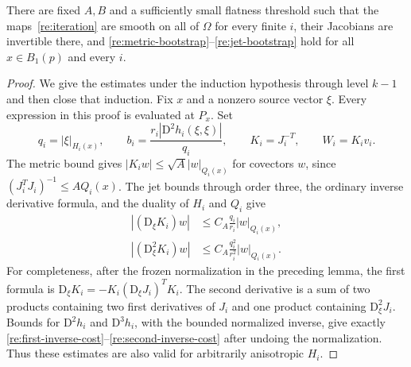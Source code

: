 \begin{proposition}
 \label{re:metric-iteration}
There are fixed $A,B$ and a sufficiently small flatness threshold
such that the maps~\eqref{re:iteration} are smooth on all of $\Omega$
for every finite $i$, their Jacobians are invertible there, and
\eqref{re:metric-bootstrap}--\eqref{re:jet-bootstrap} hold for all
$x\in B_1(p)$ and every $i$.
\end{proposition}

\begin{proof}
We give the estimates under the induction hypothesis through level
$k-1$ and then close that induction.  Fix $x$ and a nonzero source
vector $\xi$.  Every expression in this proof is evaluated at $P_x$.
Set
\[
 q_i=|\xi|_{H_i(x)},\qquad
 b_i=\frac{r_i|\mathrm D^2h_i(\xi,\xi)|}{q_i},\qquad
 K_i=J_i^{-T},\qquad W_i=K_iv_i.
\]
The metric bound gives $|K_iw|\le\sqrt A|w|_{Q_i(x)}$ for
covectors $w$, since
$(J_i^TJ_i)^{-1}\le A Q_i(x)$.
The jet bounds through order three, the ordinary inverse derivative
formula, and the duality of $H_i$ and $Q_i$ give
\begin{align}
 |(\mathrm D_\xi K_i)w|
     &\le C_A\frac{q_i}{r_i}|w|_{Q_i(x)},
       \label{re:first-inverse-cost}\\
 |(\mathrm D_\xi^2 K_i)w|
     &\le C_A\frac{q_i^2}{r_i^2}|w|_{Q_i(x)}.
       \label{re:second-inverse-cost}
\end{align}
For completeness, after the frozen normalization in the preceding
lemma, the first formula is
$\mathrm D_\xi K_i=-K_i(\mathrm D_\xi J_i)^TK_i$.
The second derivative is a sum of two products containing two first
derivatives of $J_i$ and one product containing
$\mathrm D_\xi^2J_i$.  Bounds for $\mathrm D^2h_i$ and
$\mathrm D^3h_i$, with the bounded normalized inverse, give exactly
\eqref{re:first-inverse-cost}--\eqref{re:second-inverse-cost} after
undoing the normalization.  Thus these estimates are also valid for
arbitrarily anisotropic $H_i$.


\end{proof}
